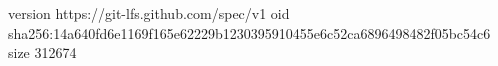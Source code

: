 version https://git-lfs.github.com/spec/v1
oid sha256:14a640fd6e1169f165e62229b1230395910455e6c52ca6896498482f05bc54c6
size 312674
